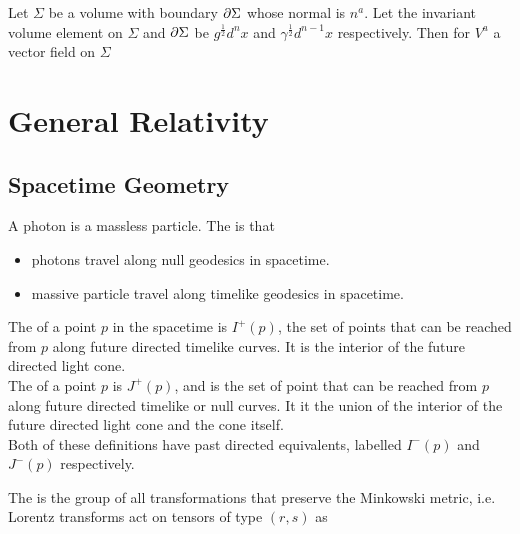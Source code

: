 \documentclass{article}
\begin{document}
\begin{theorem}
Let $\Sigma$ be a volume with boundary $\partial \Sigma$ whose normal is $n^a$. Let the invariant volume element on $\Sigma$ and $\partial \Sigma$ be $g^\frac{1}{2} d^n x $ and $\gamma^\frac{1}{2} d^{n-1}x$ respectively. Then for $V^a$ a vector field on $\Sigma$ 
\end{theorem}


\section{General Relativity}
\subsection{Spacetime Geometry}

\begin{definition}
A photon is a massless particle. The  is that 
\begin{itemize}
    \item photons travel along null geodesics in spacetime. 
    \item massive particle travel along timelike geodesics in spacetime.
\end{itemize}
\end{definition}

\begin{definition}
The  of a point $p$ in the spacetime is $I^+(p)$, the set of points that can be reached from $p$ along future directed timelike curves. It is the interior of the future directed light cone. \\
The  of a point $p$ is $J^+(p)$, and is the set of point that can be reached from $p$ along future directed timelike or null curves. It it the union of the interior of the future directed light cone and the cone itself. \\
Both of these definitions have past directed equivalents, labelled $I^-(p)$ and $J^-(p)$ respectively. 
\end{definition}

\begin{definition}
The  is the group of all transformations that preserve the Minkowski metric, i.e. 
Lorentz transforms act on tensors of type $(r,s)$ as 
\end{definition}
\end{document}
